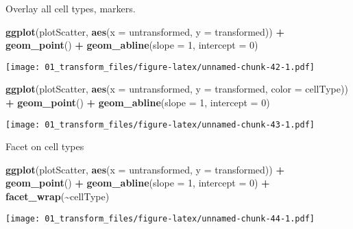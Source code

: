 \documentclass[
]{article}
\newenvironment{Shaded}{\begin{snugshade}}{\end{snugshade}}
\newcommand{\AttributeTok}[1]{\textcolor[rgb]{0.13,0.29,0.53}{#1}}
\newcommand{\DecValTok}[1]{\textcolor[rgb]{0.00,0.00,0.81}{#1}}
\newcommand{\FunctionTok}[1]{\textcolor[rgb]{0.13,0.29,0.53}{\textbf{#1}}}
\newcommand{\NormalTok}[1]{#1}
\newcommand{\SpecialCharTok}[1]{\textcolor[rgb]{0.81,0.36,0.00}{\textbf{#1}}}
\begin{document}
Overlay all cell types, markers.

\begin{Shaded}
\begin{Highlighting}[]
\FunctionTok{ggplot}\NormalTok{(plotScatter, }\FunctionTok{aes}\NormalTok{(}\AttributeTok{x =}\NormalTok{ untransformed, }\AttributeTok{y =}\NormalTok{ transformed)) }\SpecialCharTok{+} \FunctionTok{geom\_point}\NormalTok{() }\SpecialCharTok{+} 
  \FunctionTok{geom\_abline}\NormalTok{(}\AttributeTok{slope =} \DecValTok{1}\NormalTok{, }\AttributeTok{intercept =} \DecValTok{0}\NormalTok{)}
\end{Highlighting}
\end{Shaded}

\texttt{[image: 01\_transform\_files/figure-latex/unnamed-chunk-42-1.pdf]}

\begin{Shaded}
\begin{Highlighting}[]
\FunctionTok{ggplot}\NormalTok{(plotScatter, }\FunctionTok{aes}\NormalTok{(}\AttributeTok{x =}\NormalTok{ untransformed, }\AttributeTok{y =}\NormalTok{ transformed, }\AttributeTok{color =}\NormalTok{ cellType)) }\SpecialCharTok{+} \FunctionTok{geom\_point}\NormalTok{() }\SpecialCharTok{+} 
  \FunctionTok{geom\_abline}\NormalTok{(}\AttributeTok{slope =} \DecValTok{1}\NormalTok{, }\AttributeTok{intercept =} \DecValTok{0}\NormalTok{)}
\end{Highlighting}
\end{Shaded}

\texttt{[image: 01\_transform\_files/figure-latex/unnamed-chunk-43-1.pdf]}

Facet on cell types

\begin{Shaded}
\begin{Highlighting}[]
\FunctionTok{ggplot}\NormalTok{(plotScatter, }\FunctionTok{aes}\NormalTok{(}\AttributeTok{x =}\NormalTok{ untransformed, }\AttributeTok{y =}\NormalTok{ transformed)) }\SpecialCharTok{+} \FunctionTok{geom\_point}\NormalTok{() }\SpecialCharTok{+} 
  \FunctionTok{geom\_abline}\NormalTok{(}\AttributeTok{slope =} \DecValTok{1}\NormalTok{, }\AttributeTok{intercept =} \DecValTok{0}\NormalTok{) }\SpecialCharTok{+} \FunctionTok{facet\_wrap}\NormalTok{(}\SpecialCharTok{\textasciitilde{}}\NormalTok{cellType)}
\end{Highlighting}
\end{Shaded}

\texttt{[image: 01\_transform\_files/figure-latex/unnamed-chunk-44-1.pdf]}
\end{document}
